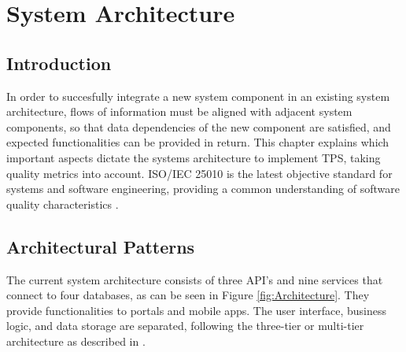 \graphicspath{{Chapter3/Figs/Vector/}{Chapter3/Figs/}}

%
\chapter{System Architecture}
\section{Introduction}
In order to succesfully integrate a new system component in an existing system architecture, flows of information must be aligned with adjacent system components, so that data dependencies of the new component are satisfied, and expected functionalities can be provided in return. This chapter explains which important aspects dictate the systems architecture to implement TPS, taking quality metrics into account. ISO/IEC 25010 is the latest objective standard for systems and software engineering, providing a common understanding of software quality characteristics \cite{iso-25010}.

%
\section{Architectural Patterns}
The current system architecture consists of three API's and nine services that connect to four databases, as can be seen in Figure \ref{fig:Architecture}. They provide functionalities to portals and mobile apps. The user interface, business logic, and data storage are separated, following the three-tier or multi-tier architecture as described in \cite{IBM-3-tier}.

